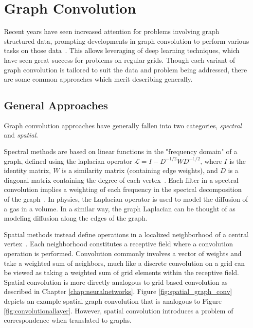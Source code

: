 \section{Graph Convolution}
Recent years have seen increased attention for problems involving graph structured data, prompting developments in graph convolution to perform various tasks on those data~\cite{bronstein2016}.
This allows leveraging of deep learning techniques, which have seen great success for problems on regular grids.
Though each variant of graph convolution is tailored to suit the data and problem being addressed, there are some common approaches which merit describing generally.


\subsection{General Approaches}
Graph convolution approaches have generally fallen into two categories, \textit{spectral} and \textit{spatial}.

Spectral methods are based on linear functions in the "frequency domain" of a graph, defined using the laplacian operator $\mathcal{L}=I-D^{-1/2}WD^{-1/2}$, where $I$ is the identity matrix, $W$ is a similarity matrix (containing edge weights), and $D$ is a diagonal matrix containing the degree of each vertex~\cite{bruna2013, henaff2015, kipf2016}.
Each filter in a spectral convolution implies a weighting of each frequency in the spectral decomposition of the graph~\cite{mallat2009}.
In physics, the Laplacian operator is used to model the diffusion of a gas in a volume.
In a similar way, the graph Laplacian can be thought of as modeling diffusion along the edges of the graph.

Spatial methods instead define operations in a localized neighborhood of a central vertex~\cite{henaff2015, atwood2016}.
Each neighborhood constitutes a receptive field where a convolution operation is performed.
Convolution commonly involves a vector of weights and take a weighted sum of neighbors, much like a discrete convolution on a grid can be viewed as taking a weighted sum of grid elements within the receptive field.
Spatial convolution is more directly analogous to grid based convolution as described in Chapter \ref{chap:neuralnetworks}.
Figure \ref{fig:spatial_graph_conv} depicts an example spatial graph convolution that is analogous to Figure \ref{fig:convolutionallayer}.
However, spatial convolution introduces a problem of correspondence when translated to graphs.

